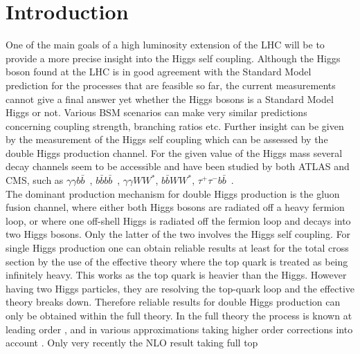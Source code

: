 \section{Introduction}
\label{sec:intro}
One of the main goals of a high luminosity extension of the LHC will be to provide a more precise insight into the Higgs self 
coupling. Although the Higgs boson found at the LHC \cite{Aad:2012tfa,Chatrchyan:2012xdj} is in good agreement with the
Standard Model prediction for the processes that are feasible so far, the current measurements cannot give a final answer
yet whether the Higgs bosons is a Standard Model Higgs or not. Various BSM scenarios can make very similar predictions
concerning coupling strength, branching ratios etc. Further insight can be given by the measurement of the Higgs self coupling
which can be assessed by the double Higgs production channel. For the given value of the Higgs mass several decay channels
seem to be accessible and have been studied by both ATLAS and CMS, such as $\gamma\gamma
b\bar{b}$~\cite{TheATLAScollaboration:2016ibb,Khachatryan:2016sey,Aad:2015xja,Aad:2014yja},
$b\bar{b}b\bar{b}$~\cite{Aaboud:2016xco,CMS:2016tlj,Aad:2015xja,Khachatryan:2015yea,Aad:2015uka},
$\gamma\gamma W W^*$, $b\bar{b}W W^*$,
$\tau^+\tau^-b\bar{b}$~\cite{ATLAS:2016qmt,CMS:2016cdj,CMS:2016ymn,CMS:2016rec,CMS:2016guv,CMS:2016ugf,CMS:2016zxv,Aad:2015xja}.\\
The dominant production mechanism for double Higgs production is the gluon fusion channel, where either both Higgs bosons
are radiated off a heavy fermion loop, or where one off-shell Higgs is radiated off the fermion loop and decays into two Higgs
bosons. Only the latter of the two involves the Higgs self coupling.  For single Higgs production one can obtain reliable results
at least for the total cross section by the use of the effective theory where the top quark is treated as being infinitely heavy.
This works as the top quark is heavier than the Higgs. However having two Higgs particles, they are resolving the top-quark
loop and the effective theory breaks down. Therefore reliable results for double Higgs production can only be obtained  within
the full theory. In the full theory the process is known at leading order \cite{Eboli:1987dy,Glover:1987nx,Plehn:1996wb}, and in various approximations
taking higher order corrections into account \cite{Dawson:1998py,Maltoni:2014eza,Grigo:2013rya,Grigo:2014jma,Grigo:2015dia,Degrassi:2016vss,
deFlorian:2013uza,deFlorian:2013jea,Shao:2013bz,deFlorian:2015moa,deFlorian:2016uhr}. Only very recently the NLO result taking full top
